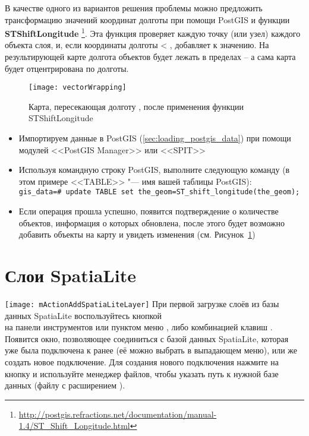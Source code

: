 В качестве одного из вариантов решения проблемы можно предложить трансформацию
значений координат долготы при помощи PostGIS и функции
\textbf{ST\textunderscore Shift\textunderscore Longitude}
\footnote{\url{http://postgis.refractions.net/documentation/manual-1.4/ST\_Shift\_Longitude.html}}.
Эта функция проверяет каждую точку (или узел) каждого объекта слоя, и,
если координаты долготы < , добавляет  к значению.
На результирующей карте долгота объектов будет лежать в пределах
 --  а сама карта будет отцентрирована по
 долготы.

\begin{figure}[ht]
   \centering
   \texttt{[image: vectorWrapping]}
   \caption{Карта, пересекающая долготу , после применения функции ST\textunderscore Shift\textunderscore Longitude \wincaption}
\label{fig:vector_wrapping}
\end{figure}


\begin{itemize}[label=--]
\item Импортируем данные в PostGIS (\ref{sec:loading_postgis_data}) при помощи
модулей <<PostGIS Manager>> или <<SPIT>>
\item Используя командную строку PostGIS, выполните следующую команду
(в этом примере <<TABLE>> "--- имя вашей таблицы PostGIS): \\
\texttt{gis\_data=\# update TABLE set the\_geom=ST\_shift\_longitude(the\_geom);}
\item Если операция прошла успешно, появится подтверждение о количестве
объектов, информация о которых обновлена, после этого будет возможно добавить
объекты на карту и увидеть изменения (см. Рисунок~\ref{fig:vector_wrapping})
\end{itemize}

\section{Слои SpatiaLite}
\label{label_spatialite}

\texttt{[image: mActionAddSpatiaLiteLayer]}
При первой загрузке слоёв из базы данных SpatiaLite воспользуйтесь кнопкой \\
на панели инструментов или пунктом
меню , либо комбинацией клавиш .
Появится окно, позволяющее соединиться с базой данных SpatiaLite,
которая уже была подключена к \qg ранее (её можно выбрать в выпадающем
меню), или же создать новое подключение. Для создания нового подключения
нажмите на кнопку  и используйте менеджер файлов, чтобы
указать путь к нужной базе данных (файлу с расширением ).

